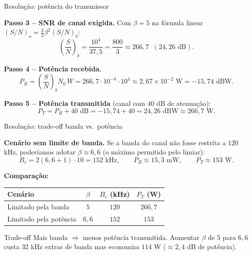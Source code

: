 
\begin{frame}{Resolução: potência do transmissor}

\textbf{Passo 3 -- SNR de canal exigida.} Com $\beta = 5$ na fórmula linear $(S/N)_o = \tfrac{3}{2}\beta^2 (S/N)_b$:
\[
\left(\frac{S}{N}\right)_b = \frac{10^4}{37{,}5} = \frac{800}{3} \approx 266{,}7 \;\;(24{,}26\text{ dB}).
\]

\textbf{Passo 4 -- Potência recebida.}
\[
P_R = \left(\frac{S}{N}\right)_b N_0\, W = 266{,}7 \cdot 10^{-8} \cdot 10^{4} \approx 2{,}67\times 10^{-2}\text{ W} = -15{,}74 \text{ dBW}.
\]

\textbf{Passo 5 -- Potência transmitida} (canal com $40$ dB de atenuação):
\[
\boxed{P_T = P_R + 40 \text{ dB} = -15{,}74 + 40 = 24{,}26 \text{ dBW} \approx 266{,}7 \text{ W}.}
\]

\end{frame}


\begin{frame}{Resolução: trade-off banda vs.\ potência}

\textbf{Cenário sem limite de banda.} Se a banda do canal não fosse restrita a $120$ kHz, poderíamos adotar $\beta \approx 6{,}6$ (o máximo permitido pelo limiar):
\[
B_c = 2(6{,}6 + 1)\cdot 10 = 152 \text{ kHz}, \qquad
P_R \approx 15{,}3 \text{ mW}, \qquad
P_T \approx 153 \text{ W}.
\]

\textbf{Comparação:}
\begin{center}
\begin{tabular}{lccc}
\toprule
Cenário & $\beta$ & $B_c$ (kHz) & $P_T$ (W) \\
\midrule
Limitado pela banda  & $5$    & $120$ & $266{,}7$ \\
Limitado pela potência & $6{,}6$ & $152$ & $153$    \\
\bottomrule
\end{tabular}
\end{center}

\begin{block}{Trade-off}
Mais banda $\Rightarrow$ menos potência transmitida. Aumentar $\beta$ de $5$ para $6{,}6$ custa $32$ kHz extras de banda mas economiza $114$ W ($\approx 2{,}4$ dB de potência).
\end{block}

\end{frame}

